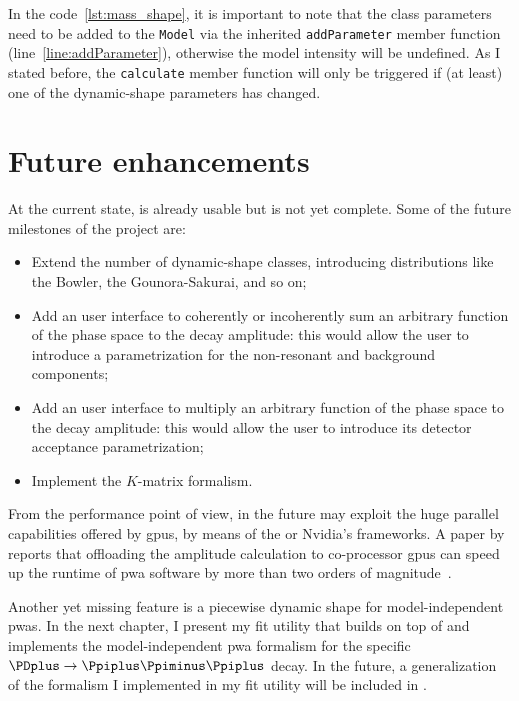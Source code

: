     
    In the code~\ref{lst:mass_shape}, it is important to note that the class parameters need to be added to the \lstinline!Model! via the inherited \lstinline!addParameter! member function (line~\ref{line:addParameter}), otherwise the model intensity will be undefined.
    As I stated before, the \lstinline!calculate! member function will only be triggered if (at least) one of the dynamic-shape parameters has changed.


    \section{Future enhancements}

    At the current state,  is already usable but is not yet complete.
    Some of the future milestones of the project are:
    \begin{itemize}
        \item
            Extend the number of dynamic-shape classes, introducing distributions like the Bowler, the Gounora-Sakurai, and so on;

        \item
            Add an user interface to coherently or incoherently sum an arbitrary function of the phase space to the decay amplitude: this would allow the user to introduce a parametrization for the non-resonant and background components;

        \item
            Add an user interface to multiply an arbitrary function of the phase space to the decay amplitude: this would allow the user to introduce its detector acceptance parametrization;

        \item
            Implement the $K$-matrix formalism.

    \end{itemize}

    From the performance point of view, in the future  may exploit the huge parallel capabilities offered by \acsp{gpu}, by means of the  or Nvidia's  frameworks.
    A paper by \citeauthor{gpu_pwa_berger} reports that offloading the amplitude calculation to co-processor \acsp{gpu} can speed up the runtime of \ac{pwa} software by more than two orders of magnitude~\cite{gpu_pwa_berger}.


    Another yet missing feature is a piecewise dynamic shape for model-independent \acp{pwa}.
    In the next chapter, I present my fit utility that builds on top of  and implements the model-independent \ac{pwa} formalism for the specific $\PDplus\to\Ppiplus\Ppiminus\Ppiplus$ decay.
    In the future, a generalization of the formalism I implemented in my fit utility will be included in .
